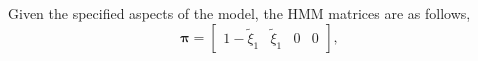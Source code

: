 \documentclass[12pt]{article}
\newcommand{\bpi}{\ensuremath{\boldsymbol{\pi}}}
\begin{document}
%
%
%

Given the specified aspects of the model, the HMM matrices are as follows,
\[
\bpi = \left[\begin{array}{cccc}
1-\tilde{\xi}_1 & \tilde{\xi}_1 & 0 & 0
\end{array}\right],
\] 
\end{document}
